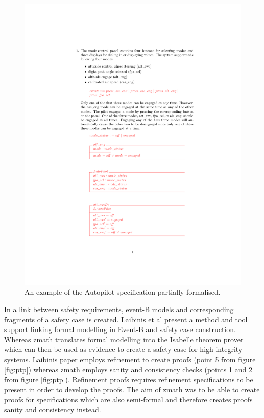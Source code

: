 \begin{figure}[H]
\begin{minipage}{0.45\textwidth}
\includegraphics[clip, trim=5.5cm 11cm 4cm 4.5cm, scale=0.6]{examples/semiform/semiformal.pdf}
\vspace{-0.2in}
\caption{An example of the Autopilot specification partially formalised. \label{fig:semiformautopilot}}
\vspace{-0.2in}
\end{minipage}
\end{figure}

In \cite{laibinis} a link between safety requirements, event-B models and corresponding fragments of
a safety case is created. Laibinis et al present a method and tool support linking formal modelling in
Event-B and safety case construction. Whereas \gls{zmath} translates formal modelling into the Isabelle 
theorem prover which can then be used as evidence to create a safety case for high integrity systems.
Laibinis paper employs refinement to create proofs (point 5 from figure \ref{fig:ptp}) whereas \gls{zmath}
employs sanity and consistency checks (points 1 and 2 from figure \ref{fig:ptp}). Refinement proofs requires
refinement specifications to be present in order to develop the proofs. The aim of \gls{zmath} was to be able
to create proofs for specifications which are also semi-formal and therefore creates proofs sanity and consistency
instead.

